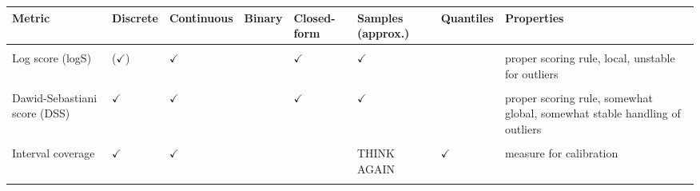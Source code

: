 \documentclass[article,shortnames]{jss}
\begin{document}
\newpage
\begin{table}[h!]
\centering
\begingroup\fontsize{10}{12}\selectfont

\begin{longtable}[t]{>{\raggedright\arraybackslash}p{2.0 cm}>{\centering\arraybackslash}p{1.4cm}>{\centering\arraybackslash}p{1.4cm}>{\centering\arraybackslash}p{1.2cm}>{\centering\arraybackslash}p{1.2cm}>{\centering\arraybackslash}p{1.4cm}>{\centering\arraybackslash}p{1.2cm}>{\raggedright\arraybackslash}p{4.5cm}}
\toprule
Metric & Discrete & Continuous & Binary & Closed-form & Samples (approx.) & Quantiles & Properties\\
\midrule
\cellcolor{gray!6}{(Continuous) ranked probability score (CRPS)} & \cellcolor{gray!6}{$\checkmark$} & \cellcolor{gray!6}{$\checkmark$} & \cellcolor{gray!6}{} & \cellcolor{gray!6}{$\checkmark$} & \cellcolor{gray!6}{$\checkmark$} & \cellcolor{gray!6}{} & \cellcolor{gray!6}{proper scoring rule, global, stable handling of outliers}\\
\addlinespace
Log score (logS) & ($\checkmark$) & $\checkmark$ &  & $\checkmark$ & $\checkmark$ &  & proper scoring rule, local, unstable for outliers\\
\addlinespace
\cellcolor{gray!6}{(Weighted) interval score (WIS)} & \cellcolor{gray!6}{$\checkmark$} & \cellcolor{gray!6}{$\checkmark$} & \cellcolor{gray!6}{} & \cellcolor{gray!6}{} & \cellcolor{gray!6}{THINK AGAIN} & \cellcolor{gray!6}{$\checkmark$} & \cellcolor{gray!6}{proper scoring rule, global, stable handling of outliers, converges to crps}\\
\addlinespace
Dawid-Sebastiani score (DSS) & $\checkmark$ & $\checkmark$ &  & $\checkmark$ & $\checkmark$ &  & proper scoring rule, somewhat global, somewhat stable handling of outliers\\
\addlinespace
\cellcolor{gray!6}{Brier score (BS)} & \cellcolor{gray!6}{} & \cellcolor{gray!6}{} & \cellcolor{gray!6}{$\checkmark$} & \cellcolor{gray!6}{} & \cellcolor{gray!6}{$\checkmark$} & \cellcolor{gray!6}{} & \cellcolor{gray!6}{proper scoring rule}\\
\addlinespace
Interval coverage & $\checkmark$ & $\checkmark$ &  &  & THINK AGAIN & $\checkmark$ & measure for calibration\\
\addlinespace
\cellcolor{gray!6}{Quantile coverage} & \cellcolor{gray!6}{$\checkmark$} & \cellcolor{gray!6}{$\checkmark$} & \cellcolor{gray!6}{} & \cellcolor{gray!6}{} & \cellcolor{gray!6}{THINK AGAIN} & \cellcolor{gray!6}{$\checkmark$} & \cellcolor{gray!6}{measure for calibration}\\

\end{longtable}
\end{table}
\end{document}
